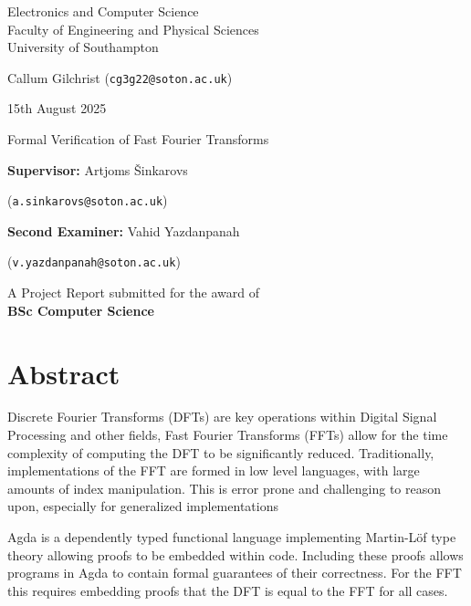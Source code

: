 \documentclass[12pt, twoside]{article}
\begin{document}
\thispagestyle{fancy}
\begin{center}
    \vspace*{20mm}
    \Large
    Electronics and Computer Science \\
    Faculty of Engineering and Physical Sciences \\
    University of Southampton 

    
    \vspace*{20mm}
    \Large Callum Gilchrist (\verb|cg3g22@soton.ac.uk|)
    
    \large 15th August 2025
    
    \vspace*{20mm}
    \Huge Formal Verification of Fast Fourier Transforms
    \vspace*{60mm}
    
    \large \textbf{Supervisor:} Artjoms Šinkarovs 

    (\verb|a.sinkarovs@soton.ac.uk|)

    \large \textbf{Second Examiner:} Vahid Yazdanpanah 

    (\verb|v.yazdanpanah@soton.ac.uk|)

    \vspace*{10mm}
    \normalsize A Project Report submitted for the award of \\
    \large \textbf{BSc Computer Science}
    
    \vspace*{10mm}
    
\end{center}
\clearpage
{}
\section*{Abstract}
Discrete Fourier Transforms (DFTs) are key operations within Digital Signal 
Processing and other fields, Fast Fourier Transforms (FFTs) allow for the time 
complexity of computing the DFT to be significantly reduced. 
Traditionally, implementations of the FFT are formed in low level 
languages, with large amounts of index manipulation. 
This is error prone and challenging to reason upon, especially for generalized 
implementations

Agda is a dependently typed functional language implementing Martin-Löf type 
theory allowing proofs to be embedded within code.
Including these proofs allows programs in Agda to contain
formal guarantees of their correctness.
For the FFT this requires embedding proofs that the DFT is equal to the FFT for 
all cases.
\end{document}
